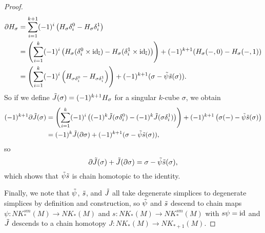 \begin{proof}
	\begin{align*}
		\partial H_\sigma& = \sum_{i = 1}^{k+1} (-1)^i\left(H_\sigma \delta_i^0-H_\sigma \delta^1_i\right)\\
		& = \left(\sum_{i = 1}^{k} (-1)^i\left(H_\sigma (\delta_i^0 \times \mathrm{id}_{\mathbb{I}})-H_\sigma (\delta^1_i \times \mathrm{id}_{\mathbb{I}})\right)\right) +(-1)^{k+1}(H_\sigma(-,0)-H_\sigma(-,1))\\
		& = \left(\sum_{i = 1}^{k} (-1)^i\left(H_{\sigma \delta_i^0}-H_{\sigma\delta^1_i}\right)\right) +(-1)^{k+1}(\sigma -\tilde \psi\tilde s(\sigma)).
	\end{align*}
	So if we define $\tilde J(\sigma) = (-1)^{k+1}H_\sigma$ for a singular $k$-cube $\sigma$, we obtain
	\begin{align*}
		(-1)^{k+1}\partial \tilde J(\sigma)& = \left(\sum_{i = 1}^{k} (-1)^i\left( (-1)^k\tilde J(\sigma \delta_i^0)-(-1)^k\tilde J(\sigma\delta^1_i)\right)\right) +(-1)^{k+1}\left(\sigma(-)-\tilde \psi\tilde s(\sigma)\right)\\
		& = (-1)^k\tilde J(\partial \sigma)+(-1)^{k+1}(\sigma - \tilde \psi\tilde s(\sigma)),
	\end{align*}
	so $$\partial \tilde J(\sigma)+\tilde J(\partial \sigma) = \sigma - \tilde \psi\tilde s(\sigma),$$
	which shows that $\tilde \psi\tilde s$ is chain homotopic to the identity.

	Finally, we note that $\tilde \psi$, $\tilde s$, and $\tilde J$ all take degenerate simplices to degenerate simplices by definition and construction, so $\tilde \psi$ and $\tilde s$  descend to chain maps $\psi \colon NK_*^{sm}(M) \to NK_*(M)$ and $s \colon NK_*(M) \to NK_*^{sm}(M)$ with $s\psi = \mathrm{id}$ and $\tilde J$ descends to a chain homotopy $J \colon NK_*(M) \to NK_{*+1}(M)$.
\end{proof}